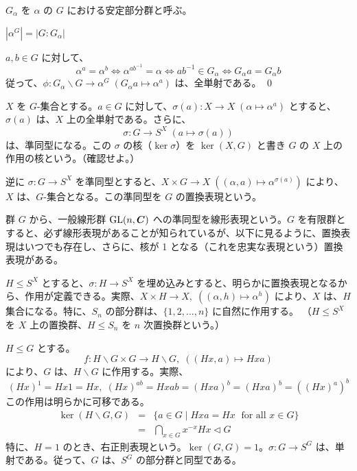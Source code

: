 $G_{\alpha}$ を $\alpha$ の $G$ における安定部分群と呼ぶ。

\begin{thm} \label{thm:orbit_length}
$|\alpha^G| = |G:G_{\alpha}|$
\end{thm}
\proof
$a,b\in G$ に対して、
$$\alpha^a = \alpha^b\Leftrightarrow \alpha^{ab^{-1}} = \alpha \Leftrightarrow ab^{-1}\in G_\alpha \Leftrightarrow G_{\alpha}a = G_{\alpha}b$$
従って、$\phi : G_{\alpha}\backslash G \to \alpha^G\;(G_{\alpha}a\mapsto \alpha^a)$ は、全単射である。
\qed

\medskip
$X$ を $G$-集合とする。$a\in G$ に対して、$\sigma(a) : X\to X\;(\alpha\mapsto \alpha^a)$ とすると、$\sigma(a)$ は、$X$ 上の全単射である。さらに、
$$\sigma : G \to S^X\;(a\mapsto \sigma(a))$$
は、準同型になる。この $\sigma$ の核（$\ker \sigma$）を $\ker(X,G)$ と書き $G$ の $X$ 上の作用の核という。（確認せよ。）

逆に $\sigma: G\to S^X$ を準同型とすると、$X\times G\to X\;((\alpha,a)\mapsto \alpha^{\sigma(a)})$ により、$X$ は、$G$-集合となる。この準同型を $G$ の置換表現という。

\note
群 $G$ から、一般線形群 $\mbox{{\rm GL}}(n,\mbox{\boldmath $C$})$ への準同型を線形表現という。$G$ を有限群とすると、必ず線形表現があることが知られているが、以下に見るように、置換表現はいつでも存在し、さらに、核が 1 となる（これを忠実な表現という）置換表現がある。

\begin{eg}
$H\leq S^X$ とすると、$\sigma : H \to S^X$ を埋め込みとすると、明らかに置換表現となるから、作用が定義できる。実際、$X\times H\to X,\;((\alpha,h)\mapsto \alpha^h)$ により、$X$ は、$H$ 集合になる。特に、$S_n$ の部分群は、$\{1,2,\ldots, n\}$ に自然に作用する。
（$H\leq S^X$ を $X$ 上の置換群、$H\leq S_n$ を $n$ 次置換群という。）
\end{eg}

\begin{eg}
$H\leq G$ とする。
$$f : H\backslash G \times G \to H\backslash G,\;((Hx,a)\mapsto Hxa)$$
により、$G$ は、$H\backslash G$ に作用する。実際、
$$(Hx)^1 = Hx1 = Hx,\;(Hx)^{ab} = Hxab = (Hxa)^b = (Hxa)^b = ((Hx)^a)^b$$
この作用は明らかに可移である。
\begin{eqnarray*}
\ker(H\backslash G,G) & = & \{a\in G\mid Hxa = Hx\;\mbox{ for all }x\in G\}\\
& = & \bigcap_{x\in G}x^{-x}Hx \lhd G
\end{eqnarray*}
特に、$H = 1$ のとき、右正則表現という。$\ker(G,G) = 1$。$\sigma:G \to S^G$ は、単射である。従って、$G$ は、$S^G$ の部分群と同型である。
\end{eg}

